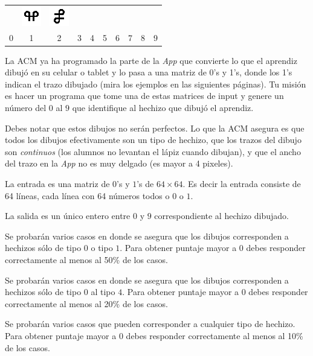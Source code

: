 \documentclass{oci}
\begin{document}
\begin{problemDescription}
\begin{center}
\begin{tabular}{cccccccccc}
\begin{minipage}[b]{32pt}
\begin{center}
\end{center} \end{minipage} &
\includegraphics{imgs/figA08.png} &
\includegraphics{imgs/figA09.png} \\
0 & 1 & 2 & 3 & 4 & 5 & 6 & 7 & 8  & 9
\end{tabular}
\end{center}

La ACM ya ha programado la parte de la \emph{App} que convierte lo que el aprendiz dibujó en su celular
o tablet y lo pasa a una matriz de 0's y 1's, donde los 1's indican el trazo dibujado (mira los ejemplos en las siguientes páginas).
Tu misión es hacer un programa que tome una de estas matrices de input y genere un número del $0$
al $9$ que identifique al hechizo que dibujó el aprendiz. 

Debes notar que estos dibujos no serán perfectos. 
Lo que la ACM asegura es que todos los dibujos efectivamente son un tipo de hechizo,
que los trazos del dibujo son \emph{continuos} (los alumnos no
levantan el lápiz cuando dibujan), y que el ancho del trazo en la \emph{App} no es muy delgado (es mayor a 4 pixeles).
\end{problemDescription}

\begin{inputDescription}
La entrada es una matriz de $0$'s y $1$'s de $64\times 64$. Es decir la entrada
consiste de 64 líneas, cada línea con 64 números todos o $0$ o $1$.
\end{inputDescription}

\begin{outputDescription}
La salida es un único entero entre $0$ y $9$ correspondiente al hechizo dibujado.
\end{outputDescription}

\begin{scoreDescription}
   Se probarán varios casos en donde se asegura que los dibujos corresponden a hechizos sólo de tipo $0$ o tipo $1$. Para obtener puntaje mayor a $0$ debes responder correctamente al menos al 50\% de los casos.
   
   Se probarán varios casos en donde se asegura que los dibujos corresponden a hechizos sólo de tipo $0$ al tipo $4$. Para obtener puntaje mayor a $0$ debes responder correctamente al menos al 20\% de los casos.
  
  
   Se probarán varios casos que pueden corresponder a cualquier tipo de hechizo. Para obtener puntaje mayor a $0$ debes responder correctamente al menos al 10\% de los casos.
\end{scoreDescription}
\end{document}
